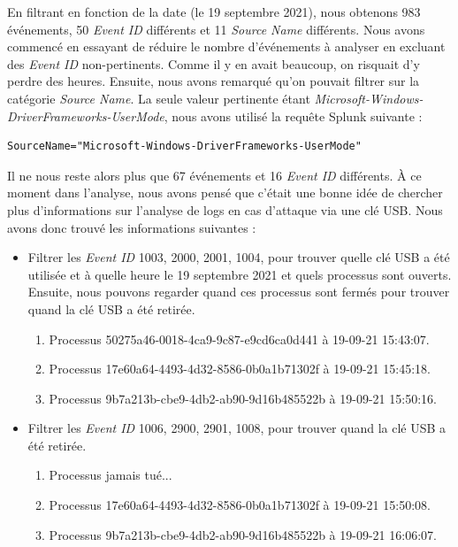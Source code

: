 \documentclass[a4paper]{article}
\begin{document}
En filtrant en fonction de la date (le 19 septembre 2021), nous obtenons 983 événements, 50 \textit{Event ID} différents et 11 \textit{Source Name} différents. Nous avons commencé en essayant de réduire le nombre d'événements à analyser en excluant des \textit{Event ID} non-pertinents. Comme il y en avait beaucoup, on risquait d'y perdre des heures. Ensuite, nous avons remarqué qu'on pouvait filtrer sur la catégorie \textit{Source Name}. La seule valeur pertinente étant \textit{Microsoft-Windows-DriverFrameworks-UserMode}, nous avons utilisé la requête Splunk suivante :
\begin{example}
\begin{Verbatim}[fontsize=\small]
SourceName="Microsoft-Windows-DriverFrameworks-UserMode"
\end{Verbatim}
\end{example}
Il ne nous reste alors plus que 67 événements et 16 \textit{Event ID} différents. À ce moment dans l'analyse, nous avons pensé que c'était une bonne idée de chercher plus d'informations sur l'analyse de logs en cas d'attaque via une clé USB. Nous avons donc trouvé les informations suivantes \cite{2} :
\begin{itemize}
    \item Filtrer les \textit{Event ID} 1003, 2000, 2001, 1004, pour trouver quelle clé USB a été utilisée et à quelle heure le 19 septembre 2021 et quels processus sont ouverts. Ensuite, nous pouvons regarder quand ces processus sont fermés pour trouver quand la clé USB a été retirée.
    \begin{enumerate}
        \item Processus 50275a46-0018-4ca9-9c87-e9cd6ca0d441 à 19-09-21 15:43:07.
        \item Processus 17e60a64-4493-4d32-8586-0b0a1b71302f à 19-09-21 15:45:18.
        \item Processus 9b7a213b-cbe9-4db2-ab90-9d16b485522b à 19-09-21 15:50:16.
    \end{enumerate}
    \item Filtrer les \textit{Event ID} 1006, 2900, 2901, 1008, pour trouver quand la clé USB a été retirée.
    \begin{enumerate}
        \item Processus jamais tué...
        \item Processus 17e60a64-4493-4d32-8586-0b0a1b71302f à 19-09-21 15:50:08.
        \item Processus 9b7a213b-cbe9-4db2-ab90-9d16b485522b à 19-09-21 16:06:07.
    \end{enumerate}
\end{itemize}
\end{document}
